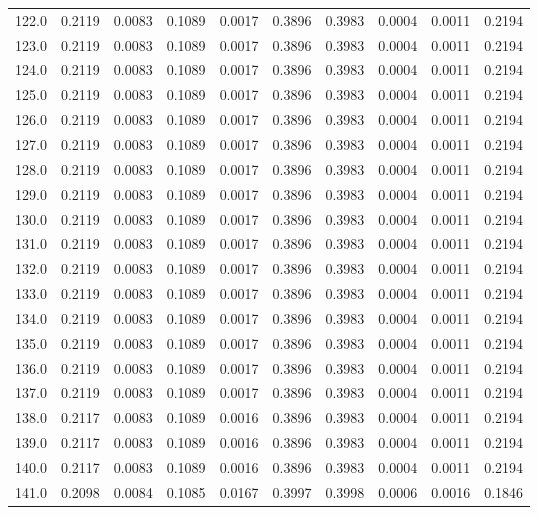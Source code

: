 \begin{longtable}{lrrrrrrrrr}
122.0 & 0.2119 & 0.0083 & 0.1089 & 0.0017 & 0.3896 & 0.3983 & 0.0004 & 0.0011 & 0.2194 \\
123.0 & 0.2119 & 0.0083 & 0.1089 & 0.0017 & 0.3896 & 0.3983 & 0.0004 & 0.0011 & 0.2194 \\
124.0 & 0.2119 & 0.0083 & 0.1089 & 0.0017 & 0.3896 & 0.3983 & 0.0004 & 0.0011 & 0.2194 \\
125.0 & 0.2119 & 0.0083 & 0.1089 & 0.0017 & 0.3896 & 0.3983 & 0.0004 & 0.0011 & 0.2194 \\
126.0 & 0.2119 & 0.0083 & 0.1089 & 0.0017 & 0.3896 & 0.3983 & 0.0004 & 0.0011 & 0.2194 \\
127.0 & 0.2119 & 0.0083 & 0.1089 & 0.0017 & 0.3896 & 0.3983 & 0.0004 & 0.0011 & 0.2194 \\
128.0 & 0.2119 & 0.0083 & 0.1089 & 0.0017 & 0.3896 & 0.3983 & 0.0004 & 0.0011 & 0.2194 \\
129.0 & 0.2119 & 0.0083 & 0.1089 & 0.0017 & 0.3896 & 0.3983 & 0.0004 & 0.0011 & 0.2194 \\
130.0 & 0.2119 & 0.0083 & 0.1089 & 0.0017 & 0.3896 & 0.3983 & 0.0004 & 0.0011 & 0.2194 \\
131.0 & 0.2119 & 0.0083 & 0.1089 & 0.0017 & 0.3896 & 0.3983 & 0.0004 & 0.0011 & 0.2194 \\
132.0 & 0.2119 & 0.0083 & 0.1089 & 0.0017 & 0.3896 & 0.3983 & 0.0004 & 0.0011 & 0.2194 \\
133.0 & 0.2119 & 0.0083 & 0.1089 & 0.0017 & 0.3896 & 0.3983 & 0.0004 & 0.0011 & 0.2194 \\
134.0 & 0.2119 & 0.0083 & 0.1089 & 0.0017 & 0.3896 & 0.3983 & 0.0004 & 0.0011 & 0.2194 \\
135.0 & 0.2119 & 0.0083 & 0.1089 & 0.0017 & 0.3896 & 0.3983 & 0.0004 & 0.0011 & 0.2194 \\
136.0 & 0.2119 & 0.0083 & 0.1089 & 0.0017 & 0.3896 & 0.3983 & 0.0004 & 0.0011 & 0.2194 \\
137.0 & 0.2119 & 0.0083 & 0.1089 & 0.0017 & 0.3896 & 0.3983 & 0.0004 & 0.0011 & 0.2194 \\
138.0 & 0.2117 & 0.0083 & 0.1089 & 0.0016 & 0.3896 & 0.3983 & 0.0004 & 0.0011 & 0.2194 \\
139.0 & 0.2117 & 0.0083 & 0.1089 & 0.0016 & 0.3896 & 0.3983 & 0.0004 & 0.0011 & 0.2194 \\
140.0 & 0.2117 & 0.0083 & 0.1089 & 0.0016 & 0.3896 & 0.3983 & 0.0004 & 0.0011 & 0.2194 \\
141.0 & 0.2098 & 0.0084 & 0.1085 & 0.0167 & 0.3997 & 0.3998 & 0.0006 & 0.0016 & 0.1846 \\

\end{longtable}
